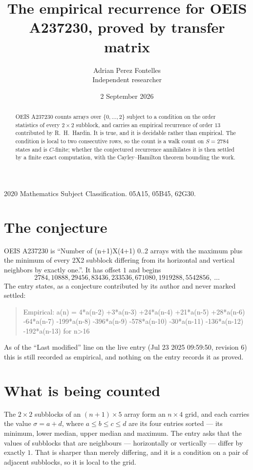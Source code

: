 \documentclass[11pt,a4paper]{article}
\title{The empirical recurrence for OEIS A237230, proved by transfer matrix}
\author{Adrian Perez Fontelles\\ \small Independent researcher}
\date{2 September 2026}
\theoremstyle{plain}
\theoremstyle{definition}
\begin{document}
\maketitle

\begin{abstract}
OEIS A237230 counts arrays over $\{0,\dots,2\}$ subject to a condition on the order
statistics of every $2\times2$ subblock, and carries an empirical recurrence of order
$13$ contributed by R.~H.~Hardin. It is true, and it is decidable rather than empirical.
The condition is local to two consecutive rows, so the count is a walk count on $S=2784$
states and is $C$-finite; whether the conjectured recurrence annihilates it is then settled by
a finite exact computation, with the Cayley--Hamilton theorem bounding the work.
\end{abstract}

\noindent\small 2020 Mathematics Subject Classification. 05A15, 05B45, 62G30.\normalsize

\section{The conjecture}

OEIS A237230 is ``Number of (n+1)X(4+1) 0..2 arrays with the maximum plus the minimum of every 2X2 subblock differing from its horizontal and vertical neighbors by exactly one.''. It has offset $1$ and begins
\[
2784, 10888, 29456, 83436, 233536, 671080, 1919288, 5542856,\ \dots
\]
The entry states, as a conjecture contributed by its author and never marked settled:
\begin{quote}
Empirical: a(n) = 4*a(n-2) +3*a(n-3) +24*a(n-4) +21*a(n-5) +28*a(n-6) -64*a(n-7) -199*a(n-8) -396*a(n-9) -578*a(n-10) -30*a(n-11) -136*a(n-12) -192*a(n-13) for n>16
\end{quote}
As of the ``Last modified'' line on the live entry (Jul 23 2025 09:59:50, revision 6) this is still
recorded as empirical, and nothing on the entry records it as proved.

\section{What is being counted}

The $2\times2$ subblocks of an $(n+1)\times5$ array form an
$n\times4$ grid, and each carries the value $\sigma=a+d$, where $a\le b\le c\le d$ are its four entries sorted --- its minimum, lower median, upper median and maximum. The entry asks that the values of
subblocks that are neighbours --- horizontally or vertically --- differ by exactly $1$.
That is sharper than merely differing, and it is a condition on a pair of adjacent subblocks,
so it is local to the grid.
\end{document}
